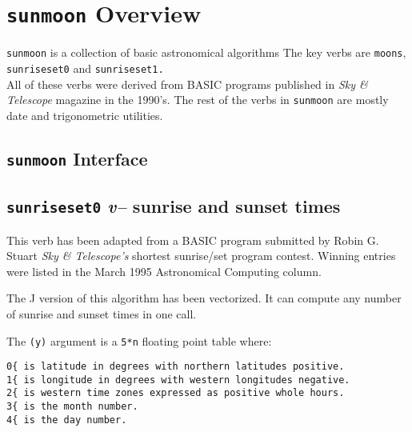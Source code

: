 \section{\texttt{sunmoon} Overview}

\texttt{sunmoon} is a collection of basic astronomical algorithms The
key verbs are \texttt{moons}, \texttt{sunriseset0} and
\texttt{sunriseset1.}\\
All of these verbs were derived from BASIC programs published in
\emph{Sky \& Telescope} magazine in the 1990's. The rest of the verbs in
\texttt{sunmoon} are mostly date and trigonometric utilities.

\subsection{\texttt{sunmoon} Interface}

\begin{Shaded}
\begin{Highlighting}[]
\hyperlink{calmoons}{}
\hyperlink{moons}{}
\hyperlink{sunriseset0}{}
\hyperlink{sunriseset1}{}
\end{Highlighting}
\end{Shaded}


\subsection{\textbf\texttt{sunriseset0} \textsl{v--} sunrise and sunset times}

This verb has been adapted from a BASIC program submitted by Robin G.
Stuart \emph{Sky \& Telescope's} shortest sunrise/set program contest.
Winning entries were listed in the March 1995 Astronomical Computing
column.

The J version of this algorithm has been vectorized. It can compute any
number of sunrise and sunset times in one call.

The \texttt{(y)} argument is a \texttt{5*n} floating point table where:

\begin{verbatim}
0{ is latitude in degrees with northern latitudes positive.
1{ is longitude in degrees with western longitudes negative.
2{ is western time zones expressed as positive whole hours.
3{ is the month number.
4{ is the day number.
\end{verbatim}

